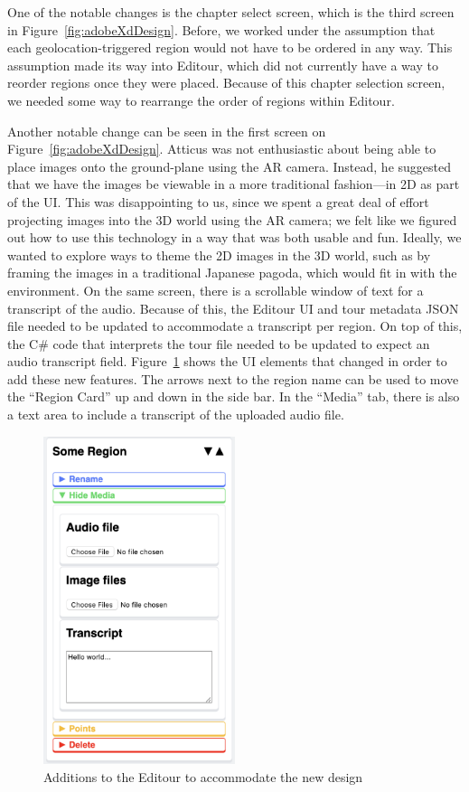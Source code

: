 \documentclass[a4paper, 10pt, american, titlepage]{article}
\begin{document}
One of the notable changes is the chapter select screen, which is the third
screen in Figure~\ref{fig:adobeXdDesign}. Before, we worked under the assumption
that each geolocation-triggered region would not have to be ordered in any way.
This assumption made its way into Editour, which did not currently have a way
to reorder regions once they were placed. Because of this chapter selection
screen, we needed some way to rearrange the order of regions within Editour.

Another notable change can be seen in the first screen on
Figure~\ref{fig:adobeXdDesign}. Atticus was not enthusiastic about being able
to place images onto the ground-plane using the AR camera. Instead, he
suggested that we have the images be viewable in a more traditional
fashion---in 2D as part of the UI. This was disappointing to us, since we spent
a great deal of effort projecting images into the 3D world using the AR camera;
we felt like we figured out how to use this technology in a way that was both
usable and fun. Ideally, we wanted to explore ways to theme the 2D images in
the 3D world, such as by framing the images in a traditional Japanese pagoda,
which would fit in with the environment. On the same screen, there is a
scrollable window of text for a transcript of the audio. Because of this, the
Editour UI and tour metadata JSON file needed to be updated to accommodate a
transcript per region. On top of this, the C\# code that interprets the tour
file needed to be updated to expect an audio transcript field.
Figure~\ref{fig:editourAdditions} shows the UI elements that changed in order
to add these new features. The arrows next to the region name can be used to
move the ``Region Card'' up and down in the side bar. In the ``Media'' tab, there
is also a text area to include a transcript of the uploaded audio file. 

\begin{figure}[h]
	\centering
	\includegraphics[width=0.5\textwidth]{editour-additions.png}
	\caption[Additions to the Editour to accommodate the new design]
    {Additions to the Editour to accommodate the new design}
	\label{fig:editourAdditions}
\end{figure}
\end{document}
